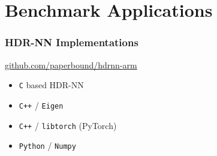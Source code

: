\documentclass{beamer}
\begin{document}
\section{Benchmark Applications}

\begin{frame}
  \frametitle{HDR-NN Implementations}

  \hyperlink{https://github.com/paperbound/hdrnn-arm}{github.com/paperbound/hdrnn-arm}

  \vspace{3em}

  \begin{itemize}
    \item \texttt{C} based HDR-NN
    \item \texttt{C++} / \texttt{Eigen}
    \item \texttt{C++} / \texttt{libtorch} (PyTorch)
    \item \texttt{Python} / \texttt{Numpy}
  \end{itemize}

\end{frame}
\end{document}

